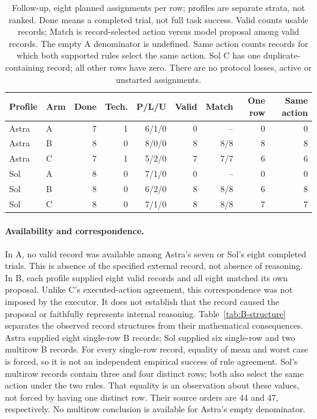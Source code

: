 \begin{table}[htbp]
\centering\small
\begin{tabular}{llrrrrrrr}\toprule
Profile & Arm & Done & Tech. & P/L/U & Valid & Match & One row & Same action\\\midrule
Astra & A & 7 & 1 & 6/1/0 & 0 & -- & 0 & 0\\
Astra & B & 8 & 0 & 8/0/0 & 8 & 8/8 & 8 & 8\\
Astra & C & 7 & 1 & 5/2/0 & 7 & 7/7 & 6 & 6\\\midrule
Sol & A & 8 & 0 & 7/1/0 & 0 & -- & 0 & 0\\
Sol & B & 8 & 0 & 6/2/0 & 8 & 8/8 & 6 & 8\\
Sol & C & 8 & 0 & 7/1/0 & 8 & 8/8 & 7 & 7\\\bottomrule
\end{tabular}
\caption{Follow-up, eight planned assignments per row; profiles are separate
strata, not ranked. Done means a completed trial, not full task success.
Valid counts usable records; Match is record-selected action versus model
proposal among valid records. The empty A denominator is undefined.
Same action counts records for which both supported rules select the same
action. Sol C has one duplicate-containing record; all other rows have zero.
There are no protocol losses, active or unstarted assignments.}
\label{tab:followup-records}
\end{table}

\paragraph{Availability and correspondence.}
In A, no valid record was available among Astra's seven or Sol's eight
completed trials. This is absence of the specified external record, not
absence of reasoning. In B, each profile supplied eight valid records and all
eight matched its own proposal. Unlike C's executed-action agreement, this
correspondence was not imposed by the executor. It does not establish that
the record caused the proposal or faithfully represents internal reasoning.
Table~\ref{tab:B-structure} separates the observed record structures from
their mathematical consequences. Astra supplied eight single-row B records;
Sol supplied six single-row and two multirow B records. For every single-row
record, equality of mean and worst case is forced, so it is not an independent
empirical success of rule agreement. Sol's multirow records contain three and
four distinct rows; both also select the same action under the two rules.
That equality is an observation about these values, not forced by having one
distinct row. Their source orders are 44 and 47, respectively. No multirow
conclusion is available for Astra's empty denominator.

